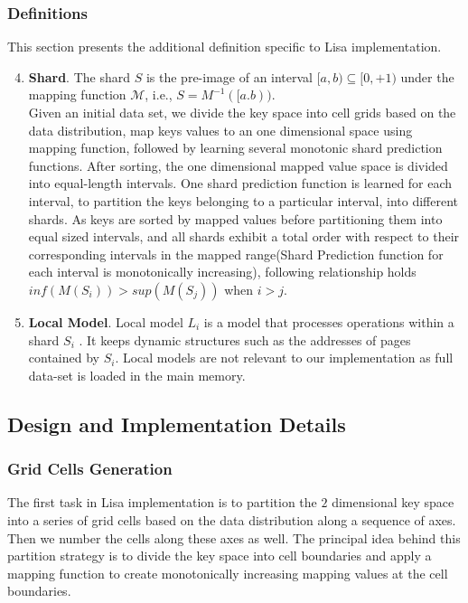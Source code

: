 \subsubsection{Definitions}

This section presents the additional definition specific to Lisa implementation.

\begin{enumerate}
\setcounter{enumi}{3}
	\item \textbf{Shard}. The shard $S$ is the pre-image of an
interval $[a, b) \subseteq [0, +1)$ under the mapping function $\mathcal{M}$,  i.e., $S = M^{-1}([a.b))$. \\
Given an initial data set, we divide the key space into cell grids based on the data distribution, map keys values to an one dimensional space using mapping function, followed by learning several monotonic shard prediction functions. After sorting, the one dimensional mapped value space is divided into equal-length intervals. One shard prediction function is learned for each interval, to partition the keys belonging to a particular interval, into different shards. As keys are sorted by mapped values before partitioning them into equal sized intervals, and all shards exhibit a total order with respect to their corresponding intervals in the mapped range(Shard Prediction function for each interval is monotonically increasing), following relationship holds \\
$ inf (M(S_{i}))  > sup (M(S_{j}))$ when $i > j$.

\item \textbf{Local Model}. Local model $L_{i}$ is a model that processes operations within a shard $S_i$ . It keeps dynamic structures such as the addresses of pages contained by $S_{i}$. Local models are not relevant to our implementation as full data-set is loaded in the main memory.
\end{enumerate}

\subsection{Design and Implementation Details}
\subsubsection{Grid Cells Generation}
The first task in Lisa implementation is to partition the $2$ dimensional key space into a series of grid cells based on the data distribution along a sequence of axes. Then we number the cells along these axes as well. The principal idea behind this partition strategy is to divide the key space into cell boundaries and apply a mapping function to create monotonically increasing mapping values at the cell boundaries. 


